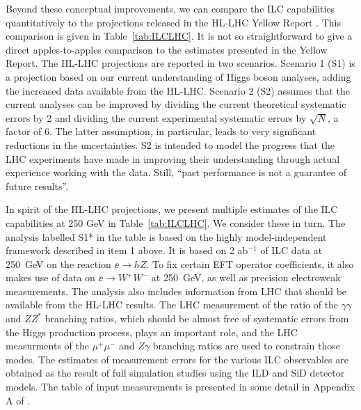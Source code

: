 Beyond these conceptual improvements, we can compare the ILC
capabilities quantitatively to the projections released in the HL-LHC
Yellow Report \cite{YR}.   This comparison is given in
Table~\ref{tab:ILCLHC}.   It is not so straightforward to give a
direct apples-to-apples comparison to the estimates presented in the
Yellow Report.    The HL-LHC projections are reported in two
scenarios.  Scenario 1 (S1) is a projection based on our current
understanding of Higgs boson analyses, adding the increased data
available from the HL-LHC.   Scenario 2 (S2) assumes that the current
analyses can be improved by dividing the current theoretical
systematic errors by 2 and dividing the current experimental
systematic errors by $\sqrt{N}$, a factor of 6.   The latter
assumption, in particular, leads to very significant reductions in the
uncertainties.   S2 is intended to model the progress that the LHC
experiments have made in improving their understanding through actual
experience working with the data.  Still, ``past performance is not a 
guarantee of  future results''.

In spirit of the HL-LHC projections, we present multiple estimates of the ILC
capabilities at 250 GeV  in Table~\ref{tab:ILCLHC}.   We consider
these in turn.   The analysis labelled S1* in the table is based
on the highly model-independent framework described in item 1 above.
It is based on 2 ab$^{-1}$ of ILC data at 250~GeV on the reaction
$\ee\to hZ$.   To fix certain EFT operator coefficients, it also makes
use of data on $\ee \to W^+W^-$ at 250~GeV, as well as precision
electroweak measurements.   The analysis also includes
information from LHC that should be available from the 
HL-LHC results.  The LHC measurement of the ratio of the $\gamma\gamma$ and 
$ZZ^*$ branching ratios, which should be almost free of systematic
errors from the Higgs production process, plays an important role, and
the LHC measurments of the 
$\mu^+\mu^-$ and $Z\gamma$ branching ratios are used to constrain
those modes. 
The estimates of measurement errors
for the various ILC observables  are obtained as the result of  full
simulation studies using the ILD and SiD detector models.   The table
of input measurements is 
presented in some detail in Appendix A of \cite{Barklow:2017suo}. 


